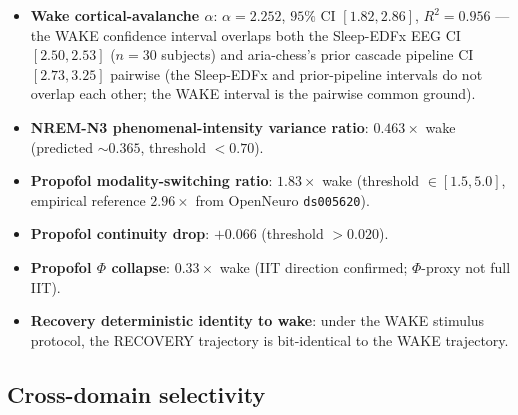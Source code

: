 \begin{itemize}\itemsep=2pt
\item \textbf{Wake cortical-avalanche $\alpha$}: $\alpha = 2.252$,
  $95\%$ CI $[1.82, 2.86]$, $R^{2}=0.956$ — the WAKE confidence
  interval overlaps both the Sleep-EDFx EEG CI $[2.50, 2.53]$
  ($n=30$ subjects) and aria-chess's prior cascade pipeline CI
  $[2.73, 3.25]$ pairwise (the Sleep-EDFx and prior-pipeline
  intervals do not overlap each other; the WAKE interval is the
  pairwise common ground).
\item \textbf{NREM-N3 phenomenal-intensity variance ratio}:
  $0.463\!\times$ wake (predicted $\sim 0.365$, threshold $<0.70$).
\item \textbf{Propofol modality-switching ratio}: $1.83\!\times$
  wake (threshold $\in [1.5, 5.0]$, empirical reference
  $2.96\!\times$ from OpenNeuro \texttt{ds005620}).
\item \textbf{Propofol continuity drop}: $+0.066$
  (threshold $> 0.020$).
\item \textbf{Propofol $\Phi$ collapse}: $0.33\!\times$ wake (IIT
  direction confirmed; $\Phi$-proxy not full IIT).
\item \textbf{Recovery deterministic identity to wake}: under the
  WAKE stimulus protocol, the RECOVERY trajectory is bit-identical
  to the WAKE trajectory.
\end{itemize}

\subsection{Cross-domain selectivity}


